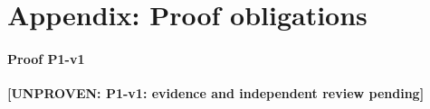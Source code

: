 \providecommand{\unproven}[1]{\textbf{[UNPROVEN: #1]}}
\section*{Appendix: Proof obligations}
\paragraph{Proof P1-v1} \unproven{P1-v1: evidence and independent review pending}
